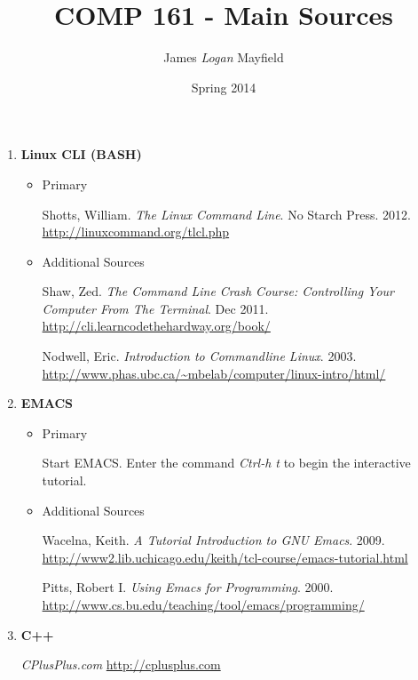 \documentclass[10pt]{article}
\title{COMP 161 - Main Sources}
\author{ James \textit{Logan} Mayfield }
\date{Spring 2014}
\begin{document}
\maketitle

\begin{enumerate}
\item \textbf{Linux CLI (BASH)}
\begin{itemize}
\item Primary 

Shotts, William. \textit{The Linux Command Line}. No Starch Press. 2012. 
\newline \url{http://linuxcommand.org/tlcl.php}

\item Additional Sources

Shaw, Zed. \textit{The Command Line Crash Course: Controlling Your Computer From The Terminal}. Dec 2011. 
\newline \url{http://cli.learncodethehardway.org/book/}
\vspace{.25in}

Nodwell, Eric. \textit{Introduction to Commandline Linux}. 2003.
\newline \url{http://www.phas.ubc.ca/~mbelab/computer/linux-intro/html/}
\end{itemize}

\item \textbf{EMACS}
\begin{itemize}
\item Primary

Start EMACS. Enter the command \textit{Ctrl-h t} to begin the interactive tutorial.


\item Additional Sources

Wacelna, Keith. \textit{A Tutorial Introduction to GNU Emacs}. 2009.
\newline \url{http://www2.lib.uchicago.edu/keith/tcl-course/emacs-tutorial.html}
\vspace{.25in}

Pitts, Robert I. \textit{Using Emacs for Programming}. 2000. 
\newline \url{http://www.cs.bu.edu/teaching/tool/emacs/programming/} 
\vspace{.25in}

\end{itemize}

\item \textbf{C++}

\textit{CPlusPlus.com} 
\newline \url{http://cplusplus.com}
\vspace{.25in}


\end{enumerate}
\end{document}
